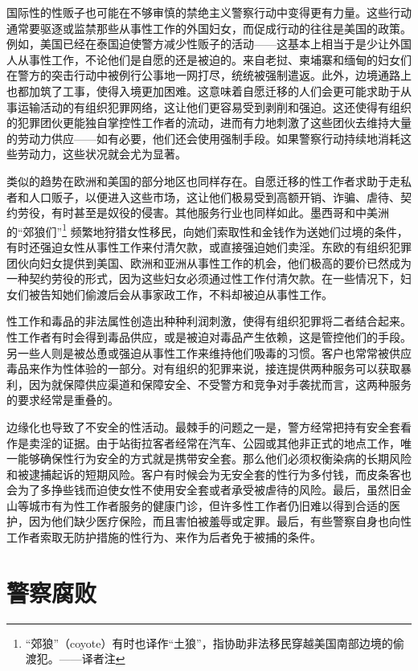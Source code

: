 \documentclass[fontset=fandol, a4paper, 12pt, openright]{ctexbook}
\begin{document}
国际性的性贩子也可能在不够审慎的禁绝主义警察行动中变得更有力量。这些行动通常要驱逐或监禁那些从事性工作的外国妇女，而促成行动的往往是美国的政策。例如，美国已经在泰国迫使警方减少性贩子的活动——这基本上相当于是少让外国人从事性工作，不论他们是自愿的还是被迫的。来自老挝、柬埔寨和缅甸的妇女们在警方的突击行动中被例行公事地一网打尽，统统被强制遣返。此外，边境通路上也都加筑了工事，使得入境更加困难。这意味着自愿迁移的人们会更可能求助于从事运输活动的有组织犯罪网络，这让他们更容易受到剥削和强迫。这还使得有组织的犯罪团伙更能独自掌控性工作者的流动，进而有力地刺激了这些团伙去维持大量的劳动力供应——如有必要，他们还会使用强制手段。如果警察行动持续地消耗这些劳动力，这些状况就会尤为显著。

类似的趋势在欧洲和美国的部分地区也同样存在。自愿迁移的性工作者求助于走私者和人口贩子，以便进入这些市场，这让他们极易受到高额开销、诈骗、虐待、契约劳役，有时甚至是奴役的侵害。其他服务行业也同样如此。墨西哥和中美洲的“郊狼们”\footnote{“郊狼”（coyote）有时也译作“土狼”，指协助非法移民穿越美国南部边境的偷渡犯。——译者注} 频繁地狩猎女性移民，向她们索取性和金钱作为送她们过境的条件，有时还强迫女性从事性工作来付清欠款，或直接强迫她们卖淫。东欧的有组织犯罪团伙向妇女提供到美国、欧洲和亚洲从事性工作的机会，他们极高的要价已然成为一种契约劳役的形式，因为这些妇女必须通过性工作付清欠款。在一些情况下，妇女们被告知她们偷渡后会从事家政工作，不料却被迫从事性工作。

性工作和毒品的非法属性创造出种种利润刺激，使得有组织犯罪将二者结合起来。性工作者有时会得到毒品供应，或是被迫对毒品产生依赖，这是管控他们的手段。另一些人则是被怂恿或强迫从事性工作来维持他们吸毒的习惯。客户也常常被供应毒品来作为性体验的一部分。对有组织的犯罪来说，接连提供两种服务可以获取暴利，因为就保障供应渠道和保障安全、不受警方和竞争对手袭扰而言，这两种服务的要求经常是重叠的。

边缘化也导致了不安全的性活动。最棘手的问题之一是，警方经常把持有安全套看作是卖淫的证据。由于站街拉客者经常在汽车、公园或其他非正式的地点工作，唯一能够确保性行为安全的方式就是携带安全套。那么他们必须权衡染病的长期风险和被逮捕起诉的短期风险。客户有时候会为无安全套的性行为多付钱，而皮条客也会为了多挣些钱而迫使女性不使用安全套或者承受被虐待的风险。最后，虽然旧金山等城市有为性工作者服务的健康门诊，但许多性工作者仍旧难以得到合适的医护，因为他们缺少医疗保险，而且害怕被羞辱或定罪。最后，有些警察自身也向性工作者索取无防护措施的性行为、来作为后者免于被捕的条件。

\section{警察腐败}
\end{document}
